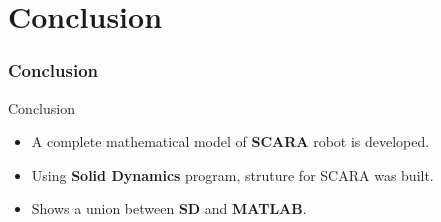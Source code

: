 \section{Conclusion}
\frametitle{Conclusion}

  \begin{frame}{Conclusion}
    \begin{itemize}
      \item A complete mathematical model of \textbf{SCARA} robot is developed.
      \item Using \textbf{Solid Dynamics} program, struture for SCARA was built.
      \item Shows a union between \textbf{SD} and \textbf{MATLAB}.
    \end{itemize}
    
  \end{frame}